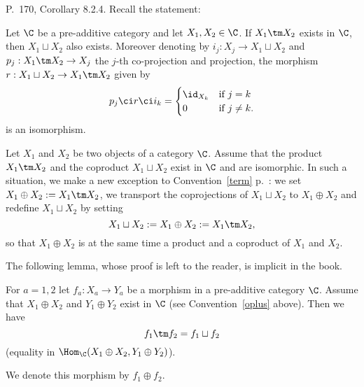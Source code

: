 \documentclass[12pt]{article}
\theoremstyle{remark}
\theoremstyle{definition}
\begin{document}
\begin{s}
P.~170, Corollary 8.2.4. Recall the statement: 

\begin{cor}[Corollary 8.2.4 p.~170] 
Let $\C$ be a pre-additive category and let $X_1,X_2\in\C$. If $X_1\tm X_2$ exists in $\C$, then $X_1\sqcup X_2$ also exists. Moreover denoting by $i_j:X_j\to X_1\sqcup X_2$ and $p_j:X_1 \tm X_2\to X_j$ the $j$-th co-projection and projection, the morphism $r:X_1\sqcup X_2\to X_1\tm X_2$ given by 
$$
p_j\ci r\ci i_k=\begin{cases}\id_{X_k}&\text{if }j=k\\0&\text{if }j\not=k.\end{cases}
$$ 
is an isomorphism. 
\end{cor} 

\begin{conv} 
Let $X_1$ and $X_2$ be two objects of a category $\C$. Assume that the product $X_1\tm X_2$ and the coproduct $X_1\sqcup X_2$ exist in $\C$ and are isomorphic. %
In such a situation, we make a new exception to Convention~\ref{term} p.~: we set $X_1\oplus X_2:=X_1\tm X_2$, we transport the coprojections of $X_1\sqcup X_2$ to $X_1\oplus X_2$ and redefine $X_1\sqcup X_2$ by setting 
$$
X_1\sqcup X_2:=X_1\oplus X_2:=X_1\tm X_2,
$$ 
so that $X_1\oplus X_2$ is at the same time a product and a coproduct of $X_1$ and $X_2$.
\end{conv} 
\end{s} 

% 

The following lemma, whose proof is left to the reader, is implicit in the book. 

\begin{lem}
For $a=1,2$ let $f_a:X_a\to Y_a$ be a morphism in a pre-additive category $\C$. Assume that $X_1\oplus X_2$ and $Y_1\oplus Y_2$ exist in $\C$ (see Convention~\ref{oplus} above). Then we have 
$$
f_1\tm f_2=f_1\sqcup f_2
$$ 
(equality in $\Hom_\C(X_1\oplus X_2,Y_1\oplus Y_2)$). 
\end{lem} 

We denote this morphism by $f_1\oplus f_2$.%
\end{document}
